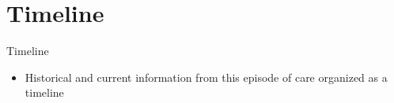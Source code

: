 \section{Timeline}
\begin{frame}{Timeline}
    \begin{itemize}
        \item Historical and current information from this episode of care organized as a timeline
    
    \end{itemize} 
\end{frame}

